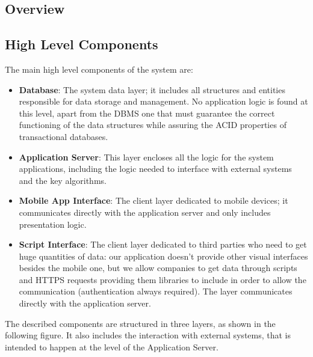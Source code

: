 
%

\subsection{Overview}

\subsection{High Level Components}
The main high level components of the system are:

\begin{itemize}
\item \textbf{Database}: The system data layer; it includes all structures and entities responsible for data storage and management. No application logic is found at this level, apart from the DBMS one that must guarantee the correct functioning of the data structures while assuring the ACID properties of transactional databases.

\item \textbf{Application Server}: This layer encloses all the logic for the system applications, including the logic needed to interface with external systems and the key algorithms.

\item \textbf{Mobile App Interface}: The client layer dedicated to mobile devices; it communicates directly with the application server and only includes presentation logic.

\item \textbf{Script Interface}:  The client layer dedicated to third parties who need to get huge quantities of data: our application doesn't provide other visual interfaces besides the mobile one, but we allow companies to get data through scripts and HTTPS requests providing them libraries to include in order to allow the communication (authentication always required). The layer communicates directly with the application server.
\end{itemize}

The described components are structured in three layers, as shown in the following figure. It also includes the interaction with external systems, that is intended to happen at the level of the Application Server.

